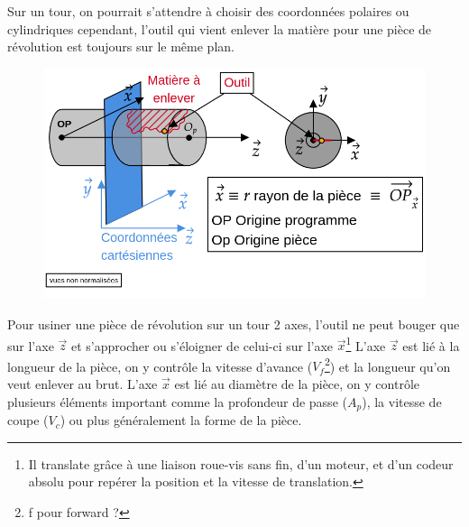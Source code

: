 \documentclass[
	11pt, %
	fleqn, %
	a4paper, %
]{LegrandOrangeBook}
\begin{document}
\begin{remark}
    Sur un tour, on pourrait s'attendre à choisir des coordonnées polaires ou cylindriques cependant, l'outil qui vient enlever la matière pour une pièce de révolution est toujours sur le même plan.

    \begin{figure}[H] %
	\centering %
	\includegraphics[width=1\textwidth]{Images/coord1.png} %
\end{figure}

Pour usiner une pièce de révolution sur un tour 2 axes, l'outil ne peut bouger que sur l'axe $\Vec{z}$ et s'approcher ou s'éloigner de celui-ci sur l'axe $\Vec{x}$\footnote{Il translate grâce à une liaison roue-vis sans fin, d'un moteur, et d'un codeur absolu pour repérer la position et la vitesse de translation.} L'axe $\Vec{z}$ est lié à la longueur de la pièce, on y contrôle la vitesse d'avance ($V_f$\footnote{f pour forward ?}) et la longueur qu'on veut enlever au brut. L'axe $\Vec{x}$ est lié au diamètre de la pièce, on y contrôle plusieurs éléments important comme la profondeur de passe ($A_p$), la vitesse de coupe ($V_c$) ou plus généralement la forme de la pièce.


\end{remark}
\end{document}
